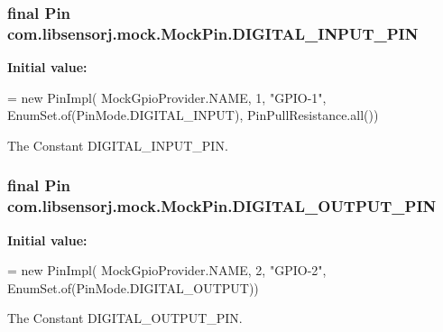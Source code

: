 \subsubsection[{D\+I\+G\+I\+T\+A\+L\+\_\+\+I\+N\+P\+U\+T\+\_\+\+P\+I\+N}]{\setlength{\rightskip}{0pt plus 5cm}final Pin com.\+libsensorj.\+mock.\+Mock\+Pin.\+D\+I\+G\+I\+T\+A\+L\+\_\+\+I\+N\+P\+U\+T\+\_\+\+P\+I\+N\hspace{0.3cm}{\ttfamily [static]}}\label{classcom_1_1libsensorj_1_1mock_1_1MockPin_ab3330359048ec50eec255e0ab6309f48}
{\bfseries Initial value\+:}
\begin{DoxyCode}
= \textcolor{keyword}{new} PinImpl(
            MockGpioProvider.NAME, 1, \textcolor{stringliteral}{"GPIO-1"},
            EnumSet.of(PinMode.DIGITAL\_INPUT), PinPullResistance.all())
\end{DoxyCode}
The Constant D\+I\+G\+I\+T\+A\+L\+\_\+\+I\+N\+P\+U\+T\+\_\+\+P\+I\+N. \hypertarget{classcom_1_1libsensorj_1_1mock_1_1MockPin_ae16d327cdbddbbdeb9314b6b28a52e82}{}
\subsubsection[{D\+I\+G\+I\+T\+A\+L\+\_\+\+O\+U\+T\+P\+U\+T\+\_\+\+P\+I\+N}]{\setlength{\rightskip}{0pt plus 5cm}final Pin com.\+libsensorj.\+mock.\+Mock\+Pin.\+D\+I\+G\+I\+T\+A\+L\+\_\+\+O\+U\+T\+P\+U\+T\+\_\+\+P\+I\+N\hspace{0.3cm}{\ttfamily [static]}}\label{classcom_1_1libsensorj_1_1mock_1_1MockPin_ae16d327cdbddbbdeb9314b6b28a52e82}
{\bfseries Initial value\+:}
\begin{DoxyCode}
= \textcolor{keyword}{new} PinImpl(
            MockGpioProvider.NAME, 2, \textcolor{stringliteral}{"GPIO-2"},
            EnumSet.of(PinMode.DIGITAL\_OUTPUT))
\end{DoxyCode}
The Constant D\+I\+G\+I\+T\+A\+L\+\_\+\+O\+U\+T\+P\+U\+T\+\_\+\+P\+I\+N. \hypertarget{classcom_1_1libsensorj_1_1mock_1_1MockPin_af15fcc7a04ad7751ca96f968d1ac1b91}{}
